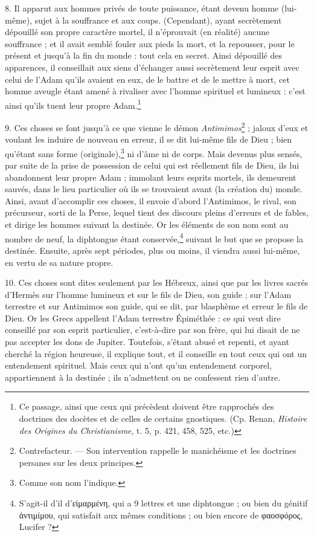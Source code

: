 \documentclass[a4paper, 11pt, oneside, polutonikogreek, french]{article}
\begin{document}
8. Il apparut aux hommes privés de toute puissance, étant devenu homme (lui-même), sujet à la souffrance et aux coups. (Cependant), ayant secrètement dépouillé son propre caractère mortel, il n'éprouvait (en réalité) aucune souffrance ; et il avait semblé fouler aux pieds la mort, et la repousser, pour le présent et jusqu'à la fin du monde : tout cela en secret. Ainsi dépouillé des apparences, il conseillait aux siens d'échanger aussi secrètement leur esprit avec celui de l'Adam qu'ils avaient en eux, de le battre et de le mettre à mort, cet homme aveugle étant amené à rivaliser avec l'homme spirituel et lumineux : c'est ainsi qu'ils tuent leur propre Adam.\footnote{Ce passage, ainsi que ceux qui précèdent doivent être rapprochés des doctrines des docètes et de celles de certains gnostiques. (Cp. Renan, \emph{Histoire des Origines du Christianisme}, t. 5, p. 421, 458, 525, etc.)}

9. Ces choses se font jusqu'à ce que vienne le démon \emph{Antimimos}\footnote{Contrefacteur. --- Son intervention rappelle le manichéisme et les doctrines persanes sur les deux principes.} ; jaloux d'eux et voulant les induire de nouveau en erreur, il se dit lui-même fils de Dieu ; bien qu'étant sans forme (originale),\footnote{Comme son nom l'indique.} ni d'âme ni de corps. Mais devenus plus sensés, par suite de la prise de possession de celui qui est réellement fils de Dieu, ils lui abandonnent leur propre Adam ; immolant leurs esprits mortels, ils demeurent sauvés, dans le lieu particulier où ils se trouvaient avant (la création du) monde. Ainsi, avant d'accomplir ces choses, il envoie d'abord l'Antimimos, le rival, son précurseur, sorti de la Perse, lequel tient des discours pleins d'erreurs et de fables, et dirige les hommes suivant la destinée. Or les éléments de son nom sont au nombre de neuf, la diphtongue étant conservée,\footnote{S'agit-il d'il d'εἱμαρμένη, qui a 9 lettres et une diphtongue ; ou bien du génitif ἀντιμίμου, qui satisfait aux mêmes conditions ; ou bien encore de φαοσφόρος, Lucifer ?} suivant le but que se propose la destinée. Ensuite, après sept périodes, plus ou moins, il viendra aussi lui-même, en vertu de sa nature propre.

10. Ces choses sont dites seulement par les Hébreux, ainsi que par les livres sacrés d'Hermès sur l'homme lumineux et sur le fils de Dieu, son guide ; sur l'Adam terrestre et sur Antimimos son guide, qui se dit, par blasphème et erreur le fils de Dieu. Or les Grecs appellent l'Adam terrestre Épiméthée : ce qui veut dire conseillé par son esprit particulier, c'est-à-dire par son frère, qui lui disait de ne pas accepter les dons de Jupiter. Toutefois, s'étant abusé et repenti, et ayant cherché la région heureuse, il explique tout, et il conseille en tout ceux qui ont un entendement spirituel. Mais ceux qui n'ont qu'un entendement corporel, appartiennent à la destinée ; ils n'admettent ou ne confessent rien d'autre.
\end{document}
